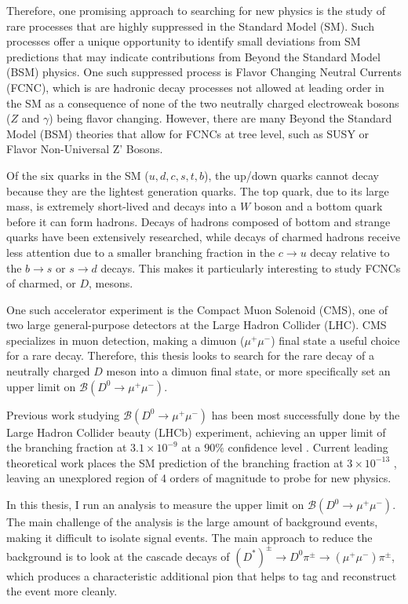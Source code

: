 Therefore, one promising approach to searching for new physics is the study of rare processes that are highly suppressed in the Standard Model (SM). Such processes offer a unique opportunity to identify small deviations from SM predictions that may indicate contributions from Beyond the Standard Model (BSM) physics. One such suppressed process is Flavor Changing Neutral Currents (FCNC), which is are hadronic decay processes not allowed at leading order in the SM as a consequence of none of the two neutrally charged electroweak bosons ($Z$ and $\gamma$) being flavor changing. However, there are many Beyond the Standard Model (BSM) theories that allow for FCNCs at tree level, such as SUSY or Flavor Non-Universal Z' Bosons.

Of the six quarks in the SM ($u,d,c,s,t,b$), the up/down quarks cannot decay because they are the lightest generation quarks. The top quark, due to its large mass, is extremely short-lived and decays into a $W$ boson and a bottom quark before it can form hadrons. Decays of hadrons composed of bottom and strange quarks have been extensively researched, while decays of charmed hadrons receive less attention due to a smaller branching fraction in the $c \to u$ decay relative to the $b\to s$ or $s \to d$ decays. This makes it particularly interesting to study FCNCs of charmed, or $D$, mesons.

One such accelerator experiment is the Compact Muon Solenoid (CMS), one of two large general-purpose detectors at the Large Hadron Collider (LHC). CMS specializes in muon detection, making a dimuon ($\mu^+\mu^-$) final state a useful choice for a rare decay. Therefore, this thesis looks to search for the rare decay of a neutrally charged $D$ meson into a dimuon final state, or more specifically set an upper limit on $\mathcal{B}(D^0 \to \mu^+ \mu^-)$.

Previous work studying $\mathcal{B}(D^0 \to \mu^+ \mu^-)$ has been most successfully done by the Large Hadron Collider beauty (LHCb) experiment, achieving an upper limit of the branching fraction at $3.1\times 10^{-9}$ at a $90\%$ confidence level \cite{ref:lhcb_2023}. Current leading theoretical work places the SM prediction of the branching fraction at $3\times 10^{-13}$ \cite{ref:burdman_2002}, leaving an unexplored region of 4 orders of magnitude to probe for new physics.

In this thesis, I run an analysis to measure the upper limit on $\mathcal{B}(D^0 \to \mu^+ \mu^-)$. The main challenge of the analysis is the large amount of background events, making it difficult to isolate signal events. The main approach to reduce the background is to look at the cascade decays of $(D^*)^\pm \to D^0 \pi^\pm \to (\mu^+ \mu^-) \pi^\pm$, which produces a characteristic additional pion that helps to tag and reconstruct the event more cleanly. 

